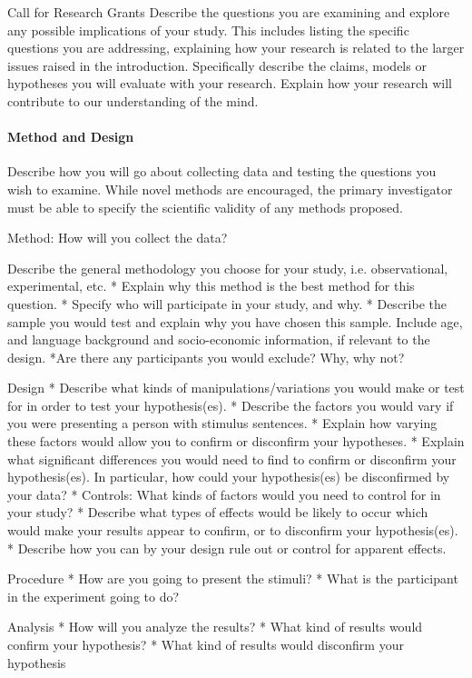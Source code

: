 \begin{refsection}
\begin{apatextbox}{Call for Research Grants}
Describe the questions you are examining and explore any possible implications of your study. This includes listing the specific questions you are addressing, explaining how your research is related to the larger issues raised in the introduction. Specifically describe the claims, models or hypotheses you will evaluate with your research. Explain how your research will contribute to our understanding of the mind.

\paragraph{Method and Design}
\label{methodanddesign}

Describe how you will go about collecting data and testing the questions you wish to examine. While novel methods are encouraged, the primary investigator must be able to specify the scientific validity of any methods proposed.

Method: How will you collect the data?

Describe the general methodology you choose for your study, i.e. observational, experimental, etc.
* Explain why this method is the best method for this question.
* Specify who will participate in your study, and why.
* Describe the sample you would test and explain why you have chosen this sample. Include age, and language background and socio-economic information, if relevant to the design.
*Are there any participants you would exclude? Why, why not?

Design
* Describe what kinds of manipulations\slash variations you would make or test for in order to test your hypothesis(es).
* Describe the factors you would vary if you were presenting a person with stimulus sentences.
* Explain how varying these factors would allow you to confirm or disconfirm your hypotheses.
* Explain what significant differences you would need to find to confirm or disconfirm your hypothesis(es). In particular, how could your hypothesis(es) be disconfirmed by your data?
* Controls: What kinds of factors would you need to control for in your study?
* Describe what types of effects would be likely to occur which would make your results appear to confirm, or to disconfirm your hypothesis(es).
* Describe how you can by your design rule out or control for apparent effects.

Procedure
* How are you going to present the stimuli?
* What is the participant in the experiment going to do?

Analysis
* How will you analyze the results?
* What kind of results would confirm your hypothesis?
* What kind of results would disconfirm your hypothesis


\end{apatextbox}
\end{refsection}
